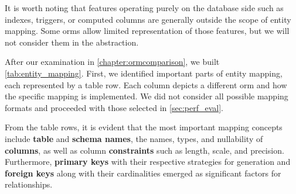 It is worth noting that features operating purely on the database side such as indexes, triggers, or computed columns are generally outside the scope of entity mapping. Some \acrshort{orm}s allow limited representation of those features, but we will not consider them in the abstraction.

After our examination in \autoref{chapter:ormcomparison}, we built \autoref{tab:entity_mapping}. First, we identified important parts of entity mapping, each represented by a table row. Each column depicts a different \acrshort{orm} and how the specific mapping is implemented. We did not consider all possible mapping formats and proceeded with those selected in \autoref{sec:perf_eval}. 

From the table rows, it is evident that the most important mapping concepts include \textbf{table} and \textbf{schema names}, the names, types, and nullability of \textbf{columns}, as well as column \textbf{constraints} such as length, scale, and precision. Furthermore, \textbf{primary keys} with their respective strategies for generation and \textbf{foreign keys} along with their cardinalities emerged as significant factors for relationships.

